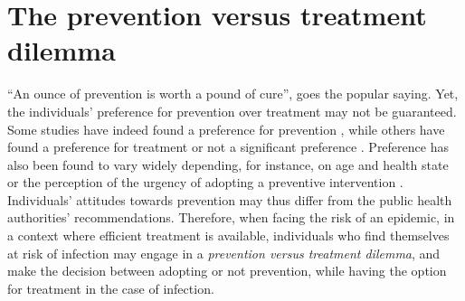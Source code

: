 %
%
%
%

\section{The prevention versus treatment dilemma}
\label{Intro:Dilemma}

``An ounce of prevention is worth a pound of cure'', goes the popular saying. Yet, the individuals' preference for prevention over treatment may not be guaranteed. Some studies have indeed found a preference for prevention \cite[]{Bosworth2010,Mortimer2008}, while others have found a preference for treatment \cite[]{Corso2002,Schwappach2002} or not a significant preference \cite[]{Ubel1998}. Preference has also been found to vary widely depending, for instance, on age and health state \cite[]{Luyten2015} or the perception of the urgency of adopting a preventive intervention \cite[]{Meertens2013}. Individuals' attitudes towards prevention may thus differ from the public health authorities' recommendations. Therefore, when facing the risk of an epidemic, in a context where efficient treatment is available, individuals who find themselves at risk of infection may engage in a \textit{prevention versus treatment dilemma}, and make the decision between adopting  or not prevention, while having the option for treatment in the case of infection. 

